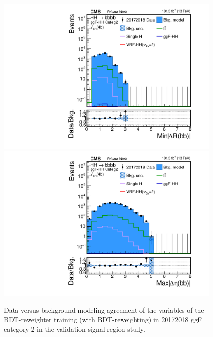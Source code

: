 \begin{figure}[htbp!]
\begin{center}
\includegraphics[width=0.24\linewidth]{Figures/Modeling/background/plotsDatadrivenWithBDT/20172018/GGFcateg2_SR_210/Histogram/plot20172018_min_4b_deltaR_Btag4_GGFcateg2_SR_210_Histogram_log.pdf}
\includegraphics[width=0.24\linewidth]{Figures/Modeling/background/plotsDatadrivenWithBDT/20172018/GGFcateg2_SR_210/Histogram/plot20172018_max_4b_deltaEta_Btag4_GGFcateg2_SR_210_Histogram_log.pdf}
\end{center}
\caption{Data versus background modeling agreement of the variables of the BDT-reweighter training (with BDT-reweighting) in 20172018 ggF category 2 in the validation signal region study.}
\label{bkg:fig:valsrbdtregvarggf2_20172018}
\end{figure}

